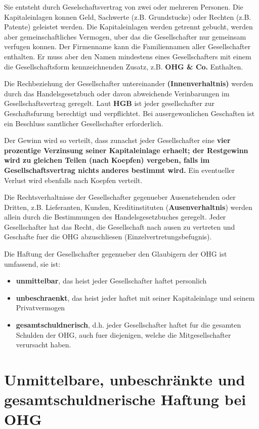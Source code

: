 \documentclass{article}
\begin{document}
Sie entsteht durch Geselschaftsvertrag von zwei oder mehreren Personen. Die
Kapitaleinlagen konnen Geld, Sachwerte (z.B. Grundstucke) oder Rechten (z.B.
Patente) geleistet werden. Die Kapitaleinlagen werden getrennt gebucht, werden
aber gemeinschaftliches Vermogen, uber das die Gesellschafter nur gemeinsam
verfugen konnen. Der Firmenname kann die Familiennamen aller Gesellschafter
enthalten. Er muss aber den Namen mindestens eines Gesellschafters mit einem
die Gesellschaftsform kennzeichnenden Zusatz, z.B. \textbf{OHG \& Co.} Enthalten.

Die Rechbeziehung der Gesellschafter untereinander \textbf{(Innenverhaltnis)} werden
durch das Handelsgesetzbuch oder davon abweichende Verinbarungen im
Gesellschaftsvertrag geregelt. Laut \textbf{HGB} ist jeder gesellschafter zur
Geschaftsfurung berechtigt und verpflichtet. Bei ausergewonlichen Geschaften
ist ein Beschluss samtlicher Gesellschafter erforderlich. 

Der Gewinn wird so verteilt, dass zunachst jeder Gesellschafter eine
\textbf{vier prozentige Verzinsung seiner Kapitaleinlage erhaelt; der
Restgewinn wird zu gleichen Teilen (nach Koepfen) vergeben, falls im
Gesellschaftsvertrag nichts anderes bestimmt wird.} Ein eventueller Verlust
wird ebenfalls nach Koepfen verteilt.

Die Rechtsverhaltnisse der Gesellschafter gegenueber Ausenstehenden oder
Dritten, z.B. Lieferanten, Kunden, Kreditinstituten (\textbf{Ausenverhaltnis}) werden
allein durch die Bestimmungen des Handelsgesetzbuches geregelt. Jeder
Gesellschafter hat das Recht, die Gesellschaft nach ausen zu vertreten und
Geschafte fuer die OHG abzuschliesen (Einzelvertretungsbefugnis).

Die Haftung der Gesellschafter gegenueber den Glaubigern der OHG ist umfassend, sie ist:
\begin{itemize}
  \item \textbf{unmittelbar}, das heist jeder Gesellschafter haftet personlich
  \item \textbf{unbeschraenkt}, das heist jeder haftet mit seiner Kapitaleinlage und seinem Privatvermogen
  \item \textbf{gesamtschuldnerisch}, d.h. jeder Gesellschafter haftet fur die gesamten Schulden der OHG, auch fuer diejenigen, welche die Mitgesellschafter verursacht haben.
\end{itemize}


\section*{Unmittelbare, unbeschränkte und gesamtschuldnerische Haftung bei OHG}
\end{document}
